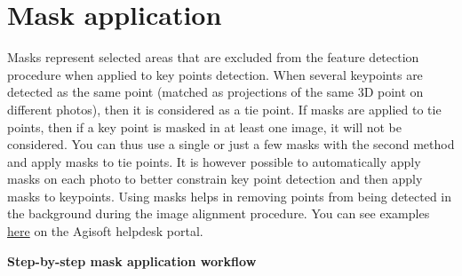 \documentclass[
]{book}
\begin{document}
\hypertarget{mask-application}{%
\section{Mask application}\label{mask-application}}

Masks represent selected areas that are excluded from the feature
detection procedure when applied to key points detection. When several
keypoints are detected as the same point (matched as projections of the
same 3D point on different photos), then it is considered as a tie
point. If masks are applied to tie points, then if a key point is masked
in at least one image, it will not be considered. You can thus use a
single or just a few masks with the second method and apply masks to tie
points. It is however possible to automatically apply masks on each
photo to better constrain key point detection and then apply masks to
keypoints. Using masks helps in removing points from being detected in the
background during the image alignment procedure. You can see examples
\href{https://agisoft.freshdesk.com/support/solutions/articles/31000158967-aligning-turntable-photos-with-background-suppression-from-single-mask-in-agisoft-metashape}{here}
on the Agisoft helpdesk portal.

\textbf{Step-by-step mask application workflow}
\end{document}

